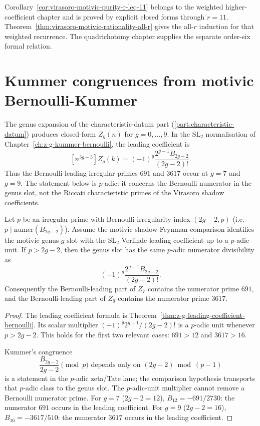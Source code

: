 \begin{remark}
Corollary~\ref{cor:virasoro-motivic-purity-r-leq-11} belongs to the
weighted higher-coefficient chapter and is proved by explicit closed
forms through $r=11$. Theorem~\ref{thm:virasoro-motivic-rationality-all-r}
gives the all-$r$ induction for that weighted recurrence.  The
quadrichotomy chapter supplies the separate order-six formal relation.
\end{remark}

\section{Kummer congruences from motivic Bernoulli-Kummer}
\label{sec:kummer}

The genus expansion of the characteristic-datum part
(\ref{part:characteristic-datum}) produces closed-form $Z_g(n)$ for
$g = 0,\ldots,9$. In the $\mathrm{SL}_2$ normalisation of
Chapter~\ref{ch:z-g-kummer-bernoulli}, the leading coefficient is
\[
 [n^{3g-3}]Z_g(k)
 =
 (-1)^g\frac{2^{g-1}B_{2g-2}}{(2g-2)!}.
\]
Thus the Bernoulli-leading irregular primes $691$ and $3617$ occur at
$g=7$ and $g=9$. The statement below is $p$-adic: it concerns the
Bernoulli numerator in the genus slot, not the Riccati characteristic
primes of the Virasoro shadow coefficients.

\begin{theorem}
\ClaimStatusConditional
Let $p$ be an irregular prime with Bernoulli-irregularity index
$(2g-2, p)$ (i.e.\ $p \mid \mathrm{numer}(B_{2g-2})$). Assume the
motivic shadow-Feynman comparison identifies the motivic genus-$g$
slot with the $\mathrm{SL}_2$ Verlinde leading coefficient up to a
$p$-adic unit. If $p>2g-2$, then the genus slot has the same
$p$-adic numerator divisibility as
\[
 (-1)^g\frac{2^{g-1}B_{2g-2}}{(2g-2)!}.
\]
Consequently the Bernoulli-leading part of $Z_7$ contains the numerator
prime $691$, and the Bernoulli-leading part of $Z_9$ contains the
numerator prime $3617$.
\end{theorem}

\begin{proof}
The leading coefficient formula is
Theorem~\ref{thm:z-g-leading-coefficient-bernoulli}. Its scalar
multiplier $(-1)^g2^{g-1}/(2g-2)!$ is a $p$-adic unit whenever
$p>2g-2$. This holds for the first two relevant cases:
$691>12$ and $3617>16$.

Kummer's congruence
\[
 \frac{B_{2g-2}}{2g-2} \pmod{p} \text{ depends only on }
 (2g-2) \bmod (p-1)
\]
is a statement in the $p$-adic zeta/Tate lane; the comparison
hypothesis transports that $p$-adic class to the genus slot. The
$p$-adic-unit multiplier cannot remove a Bernoulli numerator prime.
For $g = 7$ ($2g-2 = 12$), $B_{12} = -691/2730$: the numerator
$691$ occurs in the leading coefficient. For $g = 9$ ($2g-2 = 16$),
$B_{16} = -3617/510$: the numerator $3617$ occurs in the leading
coefficient.
\end{proof}

